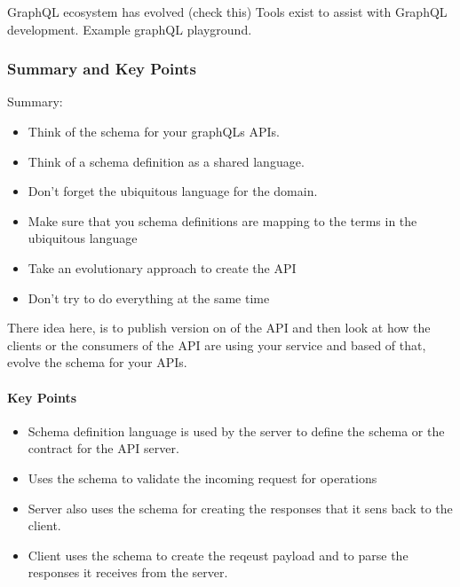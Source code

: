 GraphQL ecosystem has evolved (check this)
Tools exist to assist with GraphQL development.
Example graphQL playground.

\subsubsection{Summary and Key Points}
Summary:

\begin{itemize}
    \item Think of the schema for your graphQLs APIs.
    \item Think of a schema definition as a shared language.
    \item Don't forget the ubiquitous language for the domain.
    \item Make sure that you schema definitions are mapping to the terms in the ubiquitous language
    \item Take an evolutionary approach to create the API
    \item Don't try to do everything at the same time
\end{itemize}

\begin{note}
    There idea here, is to publish version on of the API and then look at how the clients or the consumers of the API are using your service and based of that, evolve the schema for your APIs.
\end{note}

\paragraph{Key Points}
\begin{itemize}
    \item Schema definition language is used by the server to define the schema or the contract for the API server.
    \item Uses the schema to validate the incoming request for operations
    \item Server also uses the schema for creating the responses that it sens back to the client.
    \item Client uses the schema to create the reqeust payload and to parse the responses it receives from the server.
\end{itemize}

